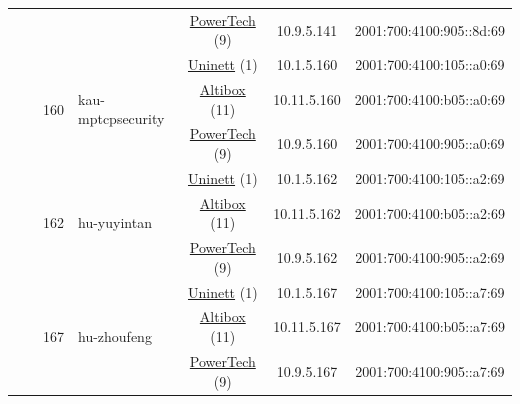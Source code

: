 \begin{small}
\begin{center}
\begin{longtable}{|c|c|c|c|c|c|c|c|}
  &  &  &  & \multicolumn{2}{|c|}{\tiny{\href{http://www.powertech.no}{PowerTech} (9)}} & \tiny{10.9.5.141} & \tiny{2001:700:4100:905::8d:69} \\* \cline{3-3}\cline{4-4}\cline{5-5}\cline{6-6}\cline{7-7}\cline{8-8}
  &  & \multirow{3}{*}{\tiny{160}} & \multicolumn{1}{|l|}{\multirow{3}{*}{\tiny{kau-mptcpsecurity}}} & \multicolumn{2}{|c|}{\tiny{\href{https://www.uninett.no}{Uninett} (1)}} & \tiny{10.1.5.160} & \tiny{2001:700:4100:105::a0:69} \\* \cline{5-5}\cline{6-6}\cline{7-7}\cline{8-8}
  &  &  &  & \multicolumn{2}{|c|}{\tiny{\href{https://www.altibox.no}{Altibox} (11)}} & \tiny{10.11.5.160} & \tiny{2001:700:4100:b05::a0:69} \\* \cline{5-5}\cline{6-6}\cline{7-7}\cline{8-8}
  &  &  &  & \multicolumn{2}{|c|}{\tiny{\href{http://www.powertech.no}{PowerTech} (9)}} & \tiny{10.9.5.160} & \tiny{2001:700:4100:905::a0:69} \\* \cline{3-3}\cline{4-4}\cline{5-5}\cline{6-6}\cline{7-7}\cline{8-8}
  &  & \multirow{3}{*}{\tiny{162}} & \multicolumn{1}{|l|}{\multirow{3}{*}{\tiny{hu-yuyintan}}} & \multicolumn{2}{|c|}{\tiny{\href{https://www.uninett.no}{Uninett} (1)}} & \tiny{10.1.5.162} & \tiny{2001:700:4100:105::a2:69} \\* \cline{5-5}\cline{6-6}\cline{7-7}\cline{8-8}
  &  &  &  & \multicolumn{2}{|c|}{\tiny{\href{https://www.altibox.no}{Altibox} (11)}} & \tiny{10.11.5.162} & \tiny{2001:700:4100:b05::a2:69} \\* \cline{5-5}\cline{6-6}\cline{7-7}\cline{8-8}
  &  &  &  & \multicolumn{2}{|c|}{\tiny{\href{http://www.powertech.no}{PowerTech} (9)}} & \tiny{10.9.5.162} & \tiny{2001:700:4100:905::a2:69} \\* \cline{3-3}\cline{4-4}\cline{5-5}\cline{6-6}\cline{7-7}\cline{8-8}
  &  & \multirow{3}{*}{\tiny{167}} & \multicolumn{1}{|l|}{\multirow{3}{*}{\tiny{hu-zhoufeng}}} & \multicolumn{2}{|c|}{\tiny{\href{https://www.uninett.no}{Uninett} (1)}} & \tiny{10.1.5.167} & \tiny{2001:700:4100:105::a7:69} \\* \cline{5-5}\cline{6-6}\cline{7-7}\cline{8-8}
  &  &  &  & \multicolumn{2}{|c|}{\tiny{\href{https://www.altibox.no}{Altibox} (11)}} & \tiny{10.11.5.167} & \tiny{2001:700:4100:b05::a7:69} \\* \cline{5-5}\cline{6-6}\cline{7-7}\cline{8-8}
  &  &  &  & \multicolumn{2}{|c|}{\tiny{\href{http://www.powertech.no}{PowerTech} (9)}} & \tiny{10.9.5.167} & \tiny{2001:700:4100:905::a7:69} \\* \cline{3-3}\cline{4-4}\cline{5-5}\cline{6-6}\cline{7-7}\cline{8-8}

\end{longtable}
\end{center}
\end{small}
